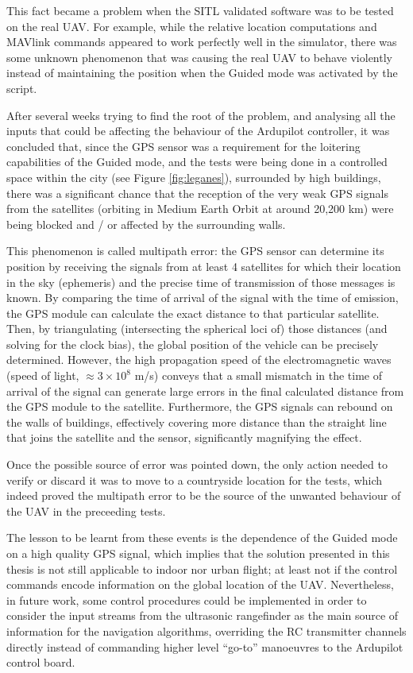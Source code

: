 This fact became a problem when the SITL validated software was to be tested on the real UAV.
For example, while the relative location computations and MAVlink commands appeared to work perfectly well in the simulator, there was some unknown phenomenon that was causing the real UAV to behave violently instead of maintaining the position when the Guided mode was activated by the script.

After several weeks trying to find the root of the problem, and analysing all the inputs that could be affecting the behaviour of the Ardupilot controller, it was concluded that, since the GPS sensor was a requirement for the loitering capabilities of the Guided mode, and the tests were being done in a controlled space within the city (see Figure \ref{fig:leganes}), surrounded by high buildings, there was a significant chance that the reception of the very weak GPS signals from the satellites (orbiting in Medium Earth Orbit at around 20,200 km) were being blocked and / or affected by the surrounding walls.



This phenomenon is called multipath error: the GPS sensor can determine its position by receiving the signals from at least 4 satellites for which their location in the sky (ephemeris) and the precise time of transmission of those messages is known.
By comparing the time of arrival of the signal with the time of emission, the GPS module can calculate the exact distance to that particular satellite.
Then, by triangulating (intersecting the spherical loci of) those distances (and solving for the clock bias), the global position of the vehicle can be precisely determined.
However, the high propagation speed of the electromagnetic waves (speed of light, $\approx 3\times 10^8$ m/s) conveys that a small mismatch in the time of arrival of the signal can generate large errors in the final calculated distance from the GPS module to the satellite.
Furthermore, the GPS signals can rebound on the walls of buildings, effectively covering more distance than the straight line that joins the satellite and the sensor, significantly magnifying the effect.

Once the possible source of error was pointed down, the only action needed to verify or discard it was to move to a countryside location for the tests, which indeed proved the multipath error to be the source of the unwanted behaviour of the UAV in the preceeding tests.

The lesson to be learnt from these events is the dependence of the Guided mode on a high quality GPS signal, which implies that the solution presented in this thesis is not still applicable to indoor nor urban flight; at least not if the control commands encode information on the global location of the UAV.
Nevertheless, in future work, some control procedures could be implemented in order to consider the input streams from the ultrasonic rangefinder as the main source of information for the navigation algorithms, overriding the RC transmitter channels directly instead of commanding higher level ``go-to'' manoeuvres to the Ardupilot control board.

